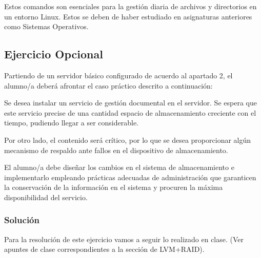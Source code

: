 Estos comandos son esenciales para la gestión diaria de archivos y directorios en un entorno Linux.
Estos se deben de haber estudiado en asignaturas anteriores como Sistemas Operativos.

\subsection{Ejercicio Opcional}

Partiendo de un servidor básico configurado de acuerdo al apartado 2, el alumno/a deberá
afrontar el caso práctico descrito a continuación:

Se desea instalar un servicio de gestión documental en el servidor. Se espera que este servicio
precise de una cantidad espacio de almacenamiento creciente con el tiempo, pudiendo llegar a
ser considerable.

Por otro lado, el contenido será crítico, por lo que se desea proporcionar
algún mecanismo de respaldo ante fallos en el dispositivo de almacenamiento.

El alumno/a debe diseñar los cambios en el sistema de almacenamiento e implementarlo
empleando prácticas adecuadas de administración que garanticen la conservación de la
información en el sistema y procuren la máxima disponibilidad del servicio.

\subsubsection{Solución}

Para la resolución de este ejercicio vamos a seguir lo realizado en clase. (Ver apuntes de clase correspondientes a la sección de LVM+RAID).



